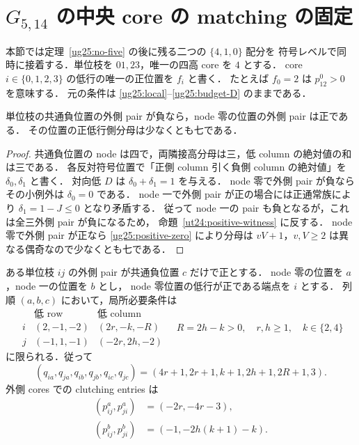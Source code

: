 \section{\texorpdfstring{$G_{5,14}$}{G5,14} の中央 core の matching の固定}
\label{cm25:section}

本節では定理~\ref{ug25:no-five} の後に残る二つの $\{4,1,0\}$ 配分を
符号レベルで同時に接着する．単位枝を $01,23$，唯一の四高 core を $4$ とする．
core $i\in\{0,1,2,3\}$ の低行の唯一の正位置を $f_i$ と書く．
たとえば $f_0=2$ は $p^0_{12}>0$ を意味する．
元の条件は \eqref{ug25:local}--\eqref{ug25:budget-D} のままである．

\begin{lemma}\label{cm25:negative-common}
単位枝の共通負位置の外側 pair が負なら，node 零の位置の外側 pair は正である．
その位置の正低行側分母は少なくとも七である．
\end{lemma}
\begin{proof}
共通負位置の node は四で，両隣接高分母は三，低 column の絶対値の和は三である．
各反対符号位置で「正側 column 引く負側 column の絶対値」を $\delta_0,\delta_1$ と書く．
対向低 $D$ は $\delta_0+\delta_1=1$ を与える．
node 零で外側 pair が負ならその小例外は $\delta_0=0$ である．
node 一で外側 pair が正の場合には正通常族により
$\delta_1=1-J\le0$ となり矛盾する．
従って node 一の pair も負となるが，これは全三外側 pair が負になるため，
命題~\ref{ut24:positive-witness} に反する．
node 零で外側 pair が正なら \eqref{ug25:positive-zero} により分母は
$vV+1$，$v,V\ge2$ は異なる偶奇なので少なくとも七である．
\end{proof}

\begin{lemma}\label{cm25:one-positive}
ある単位枝 $ij$ の外側 pair が共通負位置 $c$ だけで正とする．
node 零の位置を $a$，node 一の位置を $b$ とし，
node 零位置の低行が正である端点を $i$ とする．
列順 $(a,b,c)$ において，局所必要条件は
\begin{equation}\label{cm25:one-positive-normal}
 \begin{array}{c|c|c}
 &\text{低 row}&\text{低 column}\\\hline
 i&(2,-1,-2)&(2r,-k,-R)\\
 j&(-1,1,-1)&(-2r,2h,-2)
 \end{array}
 \quad
 R=2h-k>0,\quad r,h\ge1,\quad k\in\{2,4\}
\end{equation}
に限られる．従って
\begin{equation}\label{cm25:one-positive-q}
 (q_{ia},q_{ja},q_{ib},q_{jb},q_{ic},q_{jc})
 =(4r+1,2r+1,k+1,2h+1,2R+1,3).
\end{equation}
外側 cores での clutching entries は
\begin{align}
 (p^a_{ij},p^a_{ji})&=(-2r,-4r-3),\label{cm25:E0}\\
 (p^b_{ij},p^b_{ji})&=(-1,-2h(k+1)-k).\label{cm25:E3}
\end{align}
\end{lemma}

